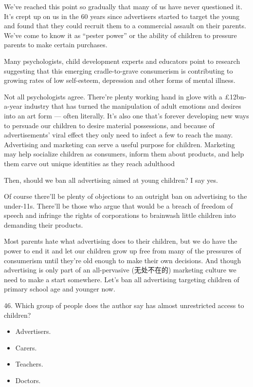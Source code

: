 \documentclass[UTF8,11pt]{ctexart}
\begin{document}
We’ve reached this point so gradually that many of us have never questioned it. It’s crept up on us in the 60 years since advertisers started to target the young and found that they could recruit them to a commercial assault on their parents. We’ve come to know it as “pester power” or the ability of children to pressure parents to make certain purchases.


Many psychologists, child development experts and educators point to research suggesting that this emerging cradle-to-grave consumerism is contributing to growing rates of low self-esteem, depression and other forms of mental illness.


Not all psychologists agree. There’re plenty working hand in glove with a £12bn-a-year industry that has turned the manipulation of adult emotions and desires into an art form — often literally. It’s also one that’s forever developing new ways to persuade our children to desire material possessions, and because of advertisements’ viral effect they only need to infect a few to reach the many. Advertising and marketing can serve a useful purpose for children. Marketing may help socialize children as consumers, inform them about products, and help them carve out unique identities as they reach adulthood


Then, should we ban all advertising aimed at young children? I say yes.


Of course there’ll be plenty of objections to an outright ban on advertising to the under-11s. There’ll be those who argue that would be a breach of freedom of speech and infringe the rights of corporations to brainwash little children into demanding their products.


Most parents hate what advertising does to their children, but we do have the power to end it and let our children grow up free from many of the pressures of consumerism until they’re old enough to make their own decisions. And though advertising is only part of an all-pervasive (无处不在的) marketing culture we need to make a start somewhere. Let’s ban all advertising targeting children of primary school age and younger now.


46. Which group of people does the author say has almost unrestricted access to children?


\begin{itemize}[leftmargin=2em,itemsep=.2em,topsep=.4em]\item[A.] Advertisers.
\item[B.] Carers.
\item[C.] Teachers.
\item[D.] Doctors.
\end{itemize}
\end{document}
